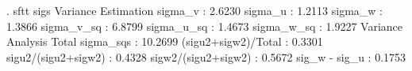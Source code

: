 . sftt sigs
{\smallskip}
               Variance Estimation          
sigma_v    :       2.6230
sigma_u    :       1.2113
sigma_w    :       1.3866
sigma_v_sq :       6.8799
sigma_u_sq :       1.4673
sigma_w_sq :       1.9227
               Variance Analysis          
Total sigma_sqs     :  10.2699
(sigu2+sigw2)/Total :  0.3301
sigu2/(sigu2+sigw2) :  0.4328
sigw2/(sigu2+sigw2) :  0.5672
sig_w - sig_u       :  0.1753
